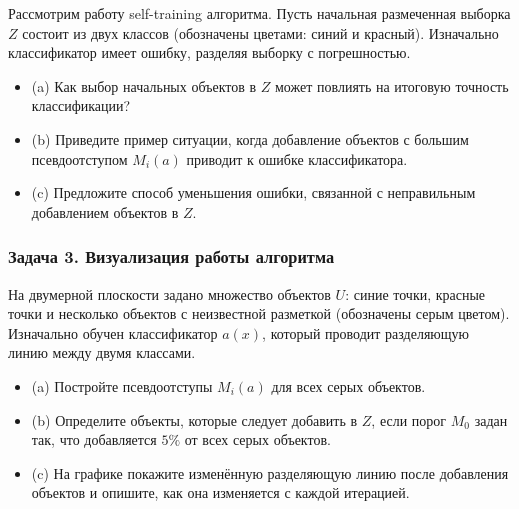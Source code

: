 Рассмотрим работу self-training алгоритма. Пусть начальная размеченная выборка $Z$ состоит из двух классов (обозначены цветами: синий и красный). Изначально классификатор имеет ошибку, разделяя выборку с погрешностью.

\begin{itemize}
    \item (a) Как выбор начальных объектов в $Z$ может повлиять на итоговую точность классификации?
    \item (b) Приведите пример ситуации, когда добавление объектов с большим псевдоотступом $M_i(a)$ приводит к ошибке классификатора.
    \item (c) Предложите способ уменьшения ошибки, связанной с неправильным добавлением объектов в $Z$.
\end{itemize}

\subsubsection*{Задача 3. Визуализация работы алгоритма}

На двумерной плоскости задано множество объектов $U$: синие точки, красные точки и несколько объектов с неизвестной разметкой (обозначены серым цветом). Изначально обучен классификатор $a(x)$, который проводит разделяющую линию между двумя классами.

\begin{itemize}
    \item (a) Постройте псевдоотступы $M_i(a)$ для всех серых объектов.
    \item (b) Определите объекты, которые следует добавить в $Z$, если порог $M_0$ задан так, что добавляется $5\%$ от всех серых объектов.
    \item (c) На графике покажите изменённую разделяющую линию после добавления объектов и опишите, как она изменяется с каждой итерацией.
\end{itemize}
